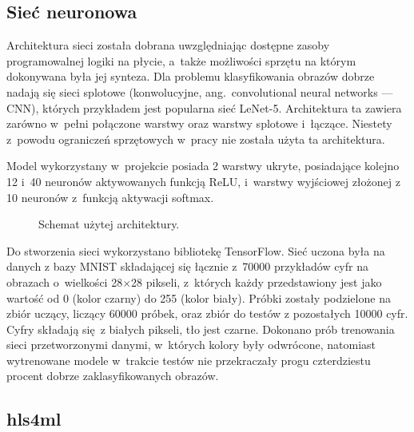 \documentclass[12pt, oneside, a4paper]{article}
\begin{document}
\subsection{Sieć neuronowa}\label{sec:Siec neuronowa}
Architektura sieci została dobrana uwzględniając dostępne zasoby programowalnej
logiki na płycie, a~także możliwości sprzętu na którym dokonywana była jej
synteza. Dla problemu klasyfikowania obrazów dobrze nadają się sieci
splotowe (konwolucyjne, ang.\ convolutional neural networks --- CNN), 
 których przykładem jest popularna sieć \mbox{LeNet-5}.
Architektura ta zawiera zarówno w~pełni połączone warstwy
oraz warstwy splotowe i~łączące.
Niestety z~powodu ograniczeń sprzętowych w~pracy nie została użyta ta
architektura.

Model wykorzystany w~projekcie posiada 2 warstwy ukryte, posiadające kolejno
12 i~40 neuronów aktywowanych funkcją ReLU, i~warstwy wyjściowej złożonej
z 10 neuronów z~funkcją aktywacji softmax.
\begin{figure}[h]
\hspace{2cm}
  \centering
  
  \caption{Schemat użytej architektury.
  }\label{fig:nn-scheme}
\end{figure}

Do stworzenia sieci wykorzystano
bibliotekę TensorFlow. Sieć uczona była na danych
z bazy MNIST składającej się łącznie z~70000 przykładów
cyfr na obrazach o~wielkości 28\(\times \)28 pikseli, z~których każdy
przedstawiony jest jako wartość od 0 (kolor czarny) do 255 (kolor biały).
Próbki zostały
podzielone na zbiór uczący, liczący 60000 próbek, oraz zbiór do testów
z pozostałych 10000 cyfr. Cyfry składają się z białych pikseli, tło jest czarne.
Dokonano prób trenowania sieci przetworzonymi danymi, w~których kolory były
odwrócone, natomiast wytrenowane modele w~trakcie testów nie przekraczały
progu czterdziestu procent dobrze zaklasyfikowanych obrazów.

\subsection{hls4ml}\label{sec:hls4ml}
\end{document}
